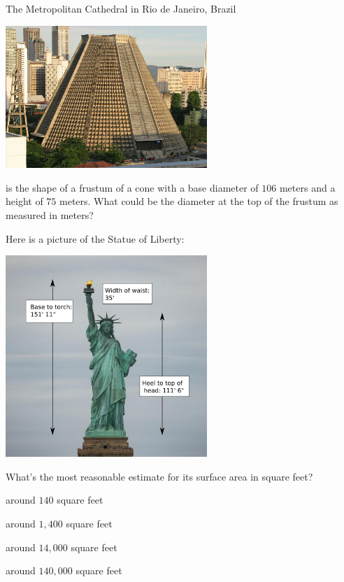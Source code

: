\documentclass[noauthor,nooutcomes]{ximera}
\begin{document}
\begin{exercise}%
  The Metropolitan Cathedral in Rio de Janeiro, Brazil
  \begin{center}
    \includegraphics[width=3in]{CatedralMetropolitanaRiodeJaneiro.jpg}
  \end{center}  
  is the shape of a frustum of a cone with a base diameter of $106$
  meters and a height of $75$ meters. What could be the diameter at
  the top of the frustum as measured in meters?
\end{exercise}





\begin{exercise}
  Here is a picture of the Statue of Liberty:
  \begin{center}
    \includegraphics[width=3in]{statueLiberty.png}
  \end{center}
  What's the most reasonable estimate for its surface area in square feet?
  \begin{enumerate}\begin{multicols}{2}
    \item around $140$ square feet
    \item around $1,400$ square feet
    \item around $14,000$ square feet
    \item around $140,000$ square feet
    \end{multicols}
  \end{enumerate}
\end{exercise}
\end{document}
